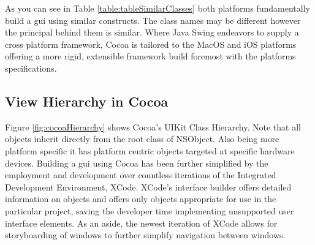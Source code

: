 \documentclass[a4paper,14pt]{article}
\begin{document}
%
%
%
%
%


As you can see in Table \ref{table:tableSimilarClasses} both platforms fundamentally build a \gls{gui} using similar constructs. The class names may be different however the principal behind them is similar. Where Java Swing endeavors to supply a cross platform framework, Cocoa is tailored to the MacOS and iOS platforms offering a more rigid, extensible framework build foremost with the platforms specifications. 
\subsection{View Hierarchy in Cocoa} %
\label{sub:view_hierarchy_in_cocoa}
Figure \ref{fig:cocoaHierarchy} shows Cocoa's UIKit Class Hierarchy. Note that all objects inherit directly from the root class of NSObject. Also being more platform specific it has platform centric objects targeted at specific hardware devices. Building a \gls{gui} using Cocoa has been further simplified by the employment and development over countless iterations of the Integrated Development Environment, XCode. XCode's interface builder offers detailed information on objects and offers only objects appropriate for use in the particular project, saving the developer time implementing unsupported user interface elements. As an aside, the newest iteration of XCode allows for storyboarding of windows to further simplify navigation between windows.
\end{document}
